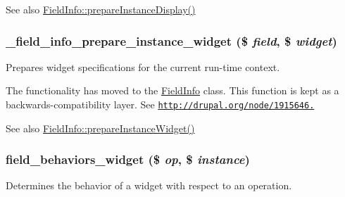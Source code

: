 \begin{DoxySeeAlso}{See also}
\hyperlink{classFieldInfo_a79100b16f20d8bc081e4108da2e714b6}{FieldInfo::prepareInstanceDisplay()} 
\end{DoxySeeAlso}
\hypertarget{group__field__info_gab26a944e3e07f9a9e4c65ab46b89e2f3}{
\subsubsection[{\_\-field\_\-info\_\-prepare\_\-instance\_\-widget}]{\setlength{\rightskip}{0pt plus 5cm}\_\-field\_\-info\_\-prepare\_\-instance\_\-widget (\$ {\em field}, \/  \$ {\em widget})}}
\label{group__field__info_gab26a944e3e07f9a9e4c65ab46b89e2f3}
Prepares widget specifications for the current run-\/time context.

The functionality has moved to the \hyperlink{classFieldInfo}{FieldInfo} class. This function is kept as a backwards-\/compatibility layer. See \href{http://drupal.org/node/1915646.}{\tt http://drupal.org/node/1915646.}

\begin{DoxySeeAlso}{See also}
\hyperlink{classFieldInfo_a882515272656cf94dee3aa51acd2d21d}{FieldInfo::prepareInstanceWidget()} 
\end{DoxySeeAlso}
\hypertarget{group__field__info_ga5a67471e2842a7ab75ed3d03f645cf5a}{
\subsubsection[{field\_\-behaviors\_\-widget}]{\setlength{\rightskip}{0pt plus 5cm}field\_\-behaviors\_\-widget (\$ {\em op}, \/  \$ {\em instance})}}
\label{group__field__info_ga5a67471e2842a7ab75ed3d03f645cf5a}
Determines the behavior of a widget with respect to an operation.


